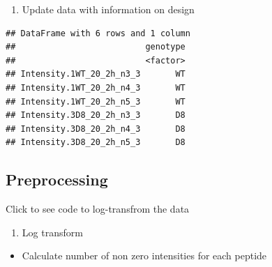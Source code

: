 \documentclass[
]{article}
\newenvironment{Shaded}{\begin{snugshade}}{\end{snugshade}}
\newcommand{\DecValTok}[1]{\textcolor[rgb]{0.00,0.00,0.81}{#1}}
\newcommand{\FunctionTok}[1]{\textcolor[rgb]{0.00,0.00,0.00}{#1}}
\newcommand{\NormalTok}[1]{#1}
\newcommand{\OtherTok}[1]{\textcolor[rgb]{0.56,0.35,0.01}{#1}}
\newcommand{\SpecialCharTok}[1]{\textcolor[rgb]{0.00,0.00,0.00}{#1}}
\newcommand{\StringTok}[1]{\textcolor[rgb]{0.31,0.60,0.02}{#1}}
\providecommand{\tightlist}{%
  \setlength{\itemsep}{0pt}\setlength{\parskip}{0pt}}
\begin{document}
\begin{enumerate}
\def\labelenumi{\arabic{enumi}.}
\setcounter{enumi}{4}
\tightlist
\item
  Update data with information on design
\end{enumerate}

\begin{Shaded}
\end{Shaded}

\begin{verbatim}
## DataFrame with 6 rows and 1 column
##                          genotype
##                          <factor>
## Intensity.1WT_20_2h_n3_3       WT
## Intensity.1WT_20_2h_n4_3       WT
## Intensity.1WT_20_2h_n5_3       WT
## Intensity.3D8_20_2h_n3_3       D8
## Intensity.3D8_20_2h_n4_3       D8
## Intensity.3D8_20_2h_n5_3       D8
\end{verbatim}

\hypertarget{preprocessing}{%
\subsection{Preprocessing}\label{preprocessing}}

Click to see code to log-transfrom the data

\begin{enumerate}
\def\labelenumi{\arabic{enumi}.}
\tightlist
\item
  Log transform
\end{enumerate}

\begin{itemize}
\tightlist
\item
  Calculate number of non zero intensities for each peptide
\end{itemize}

\begin{Shaded}
\end{Shaded}
\end{document}
